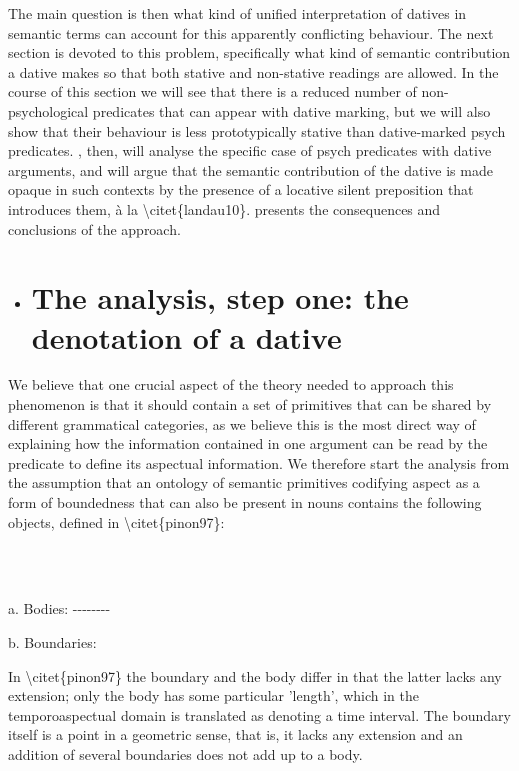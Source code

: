 \documentclass[output=paper,modfonts,nonflat]{langsci/langscibook}
\begin{document}
The main question is then what kind of unified interpretation of datives in semantic terms can account for this apparently conflicting behaviour. The next section is devoted to this problem, specifically what kind of semantic contribution a dative makes so that both stative and non-stative readings are allowed. In the course of this section we will see that there is a reduced number of non-psychological predicates that can appear with dative marking, but we will also show that their behaviour is less prototypically stative than dative-marked psych predicates. , then, will analyse the specific case of psych predicates with dative arguments, and will argue that the semantic contribution of the dative is made opaque in such contexts by the presence of a locative silent preposition that introduces them, à la {\textbackslash}citet\{landau10\}.  presents the consequences and conclusions of the approach.

\begin{itemize}
\item \section{The analysis, step one: the denotation of a dative}
\end{itemize}

We believe that one crucial aspect of the theory needed to approach this phenomenon is that it should contain a set of primitives that can be shared by different grammatical categories, as we believe this is the most direct way of explaining how the information contained in one argument can be read by the predicate to define its aspectual information. We therefore start the analysis from the assumption that an ontology of semantic primitives codifying aspect as a form of boundedness that can also be present in nouns contains the following objects, defined in {\textbackslash}citet\{pinon97\}:

\ea%
    \label{ex:key:13}
    \gll\\
        \\
    \glt
    \z

            a. Bodies: -{}-{}-{}-{}-{}-{}-{}-

        b. Boundaries: {\textbar}

In {\textbackslash}citet\{pinon97\} the boundary and the body differ in that the latter lacks any extension; only the body has some particular 'length', which in the temporoaspectual domain is translated as denoting a time interval. The boundary itself is a point in a geometric sense, that is, it lacks any extension and an addition of several boundaries does not add up to a body.
\end{document}
